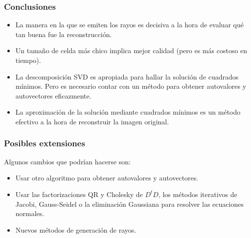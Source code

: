\documentclass{beamer}
\begin{document}
\begin{frame}
\frametitle{Conclusiones}
\begin{itemize}
\item<1-> La manera en la que se emiten los rayos es decisiva a la hora de evaluar qué tan buena fue la reconstrucción.
\item<2-> Un tamaño de celda más chico implica mejor calidad (pero es más costoso en tiempo).
\item<3-> La descomposición SVD es apropiada para hallar la solución de cuadrados mínimos. Pero es necesario contar con un método para obtener 
autovalores y autovectores eficazmente.
\item<4-> La aproximación de la solución mediante cuadrados mínimos es un método efectivo a la hora de reconstruir la imagen original.
\end{itemize}
\end{frame}

\begin{frame}
\frametitle{Posibles extensiones}
Algunos cambios que podrían hacerse son:
\begin{itemize}
\item<1-> Usar otro algoritmo para obtener autovalores y autovectores.
\item<2-> Usar las factorizaciones QR y Cholesky de $D^{t}D$, los métodos iterativos de Jacobi, Gauss-Seidel o la eliminación Gaussiana para resolver 
las ecuaciones normales.
\item<3-> Nuevos métodos de generación de rayos.
\end{itemize}

\end{frame}
\end{document}

